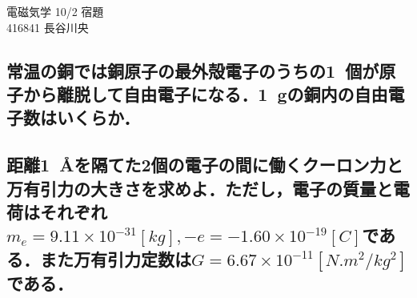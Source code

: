 \documentclass[a4j,12pt]{jsarticle}
\begin{document}
\begin{center}
    \begin{LARGE}
        {\huge 電磁気学 10/2 宿題}\vspace{0.2em}\\ 416841 長谷川央
    \end{LARGE}
\end{center}

\subsection{常温の銅では銅原子の最外殻電子のうちの\SI{1}{個}が原子から離脱して自由電子になる．\SI{1}{g}の銅内の自由電子数はいくらか．}

\vspace{20em}
\subsection{距離\SI{1}{\AA}を隔てた2個の電子の間に働くクーロン力と万有引力の大きさを求めよ．ただし，電子の質量と電荷はそれぞれ \(m_e=9.11\times10^{-31}[\si{kg}], -e=-1.60\times10^{-19}[\si{C}]\)である．また万有引力定数は\(G=6.67\times10^{-11}[\si{N.m^2/kg^2}]\)である．}
\end{document}
